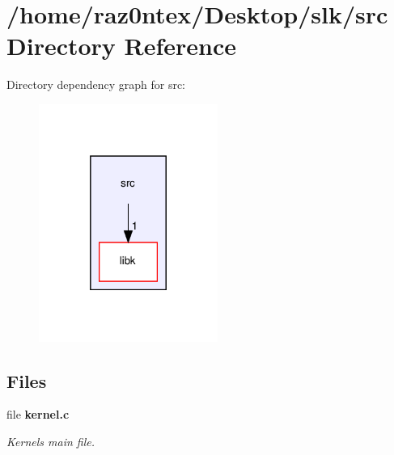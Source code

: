 \section{/home/raz0ntex/\+Desktop/slk/src Directory Reference}
\label{dir_68267d1309a1af8e8297ef4c3efbcdba}
Directory dependency graph for src\+:
\nopagebreak
\begin{figure}[H]
\begin{center}
\leavevmode
\includegraphics[width=166pt]{dir_68267d1309a1af8e8297ef4c3efbcdba_dep}
\end{center}
\end{figure}
\subsection*{Files}
\begin{DoxyCompactItemize}
\item 
file \textbf{ kernel.\+c}
\begin{DoxyCompactList}\small\item\em Kernel\textquotesingle{}s main file. \end{DoxyCompactList}\end{DoxyCompactItemize}
